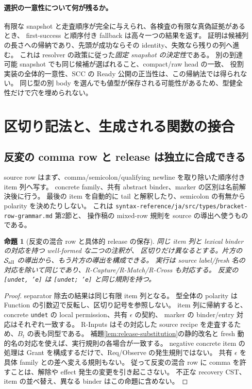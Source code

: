 \documentclass[11pt,a4paper]{article}
\newtheorem{proposition}[definition]{命題}
\newcommand{\Src}{\mathcal S}
\begin{document}
\paragraph{選択の一意性について何が残るか。}
有限な snapshot と走査順序が完全に与えられ、各検査の有限な真偽証拠があるとき、
first-success と順序付き fallback は高々一つの結果を返す。
証明は候補列の長さへの帰納であり、先頭が成功ならその identity、失敗なら残りの列へ進む。
これは resolver の政策に従った\emph{固定 snapshot の決定性}である。
別の到達可能 snapshot でも同じ候補が選ばれること、compact/raw head の一致、
役割実装の全体的一意性、SCC の Ready 公開の正当性は、この帰納法では得られない。
同じ型の別 body を選んでも値型が保存される可能性があるため、型健全性だけで穴を埋められない。

\section{区切り記法と、生成される関数の接合}
\label{sec:surface-bridge}

\subsection{反変の comma row と release は独立に合成できる}

source row はまず、comma/semicolon/qualifying newline を取り除いた順序付き item 列へ写す。
concrete family、共有 abstract binder、marker の区別は名前解決後に行う。
最後の item を自動的に tail と解釈したり、semicolon の有無から polarity を決めたりしない。
これは \nolinkurl{syntax-reference/ja/src/types/bracket-row-grammar.md} 第2節と、
操作稿の mixed-row 規則を source の導出へ使うものである。

\begin{proposition}[反変の混合 row と具体的 release の保存]
\label{prop:mixed-release}
同じ item 列と lexical binder の対応を持つ well-formed な二つの注釈が、
区切りだけ異なるとする。片方の \(\Src_{\rm all}\) の導出から、もう片方の導出を構成できる。
実行は source label/fresh 名の対応を除いて同じであり、R-Capture/R-Match/R-Cross も対応する。
反変の \texttt{[undet, 'e]} は \texttt{[undet; 'e]} と同じ規則を持つ。
\end{proposition}
\begin{proof}
separator 除去の結果は同じ有限 item 列となる。
型全体の polarity は Function の引数辺で反転し、区切り記号を参照しない。
item 列に帰納すると、concrete \texttt{undet} の local permission、共有 \(\epsilon\) の契約、
marker の binder/entry 対応はそれぞれ一致する。
R-Inputs はその対応した source recipe を走査するため、\(B_t\) の表も同型である。
補題\ref{lem:release-substitution}の静的改名と fresh 動的名の対応を使えば、実行規則の各場合が一致する。
negative concrete item の処理は Grant を構成するだけで、Req/Observe の発生規則ではない。
共有 \(\epsilon\) を具体 family との差へ変える規則もない。
従って反変の混合 row に comma を許すことは、解除や effect 発生の変更を引き起こさない。
不正な recovery CST、item の並べ替え、異なる binder はこの命題に含めない。
\end{proof}
\end{document}

